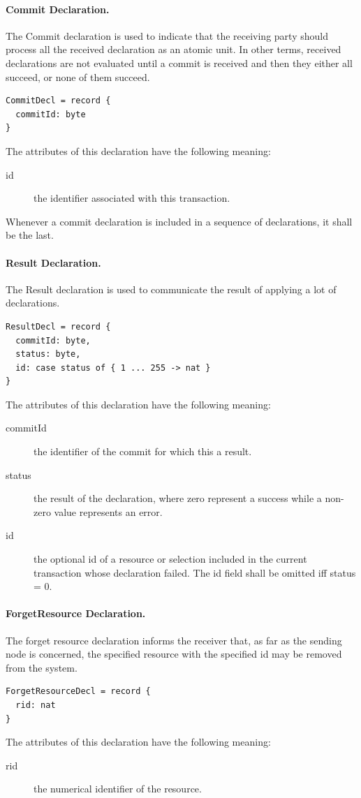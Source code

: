\documentclass[a4paper,oneside,article]{memoir}
\begin{document}
\paragraph{Commit Declaration.} The Commit declaration is used to indicate that the receiving party
should process all the received declaration as an atomic unit.  In other terms, received
declarations are not evaluated until a commit is received and then they either all succeed, or none
of them succeed.
\begin{verbatim}
CommitDecl = record {
  commitId: byte
}
\end{verbatim}
The attributes of this declaration have the following meaning:
\begin{description}
\item[id] the identifier associated with this transaction.
\end{description}
Whenever a commit declaration is included in a sequence of declarations, it shall be the last.

\paragraph{Result Declaration.} The Result declaration is used to communicate the result of
applying a lot of declarations.
\begin{verbatim}
ResultDecl = record {
  commitId: byte,
  status: byte,
  id: case status of { 1 ... 255 -> nat }
}
\end{verbatim}
The attributes of this declaration have the following meaning:
\begin{description}
\item[commitId] the identifier of the commit for which this a result.
\item[status] the result of the declaration, where zero represent a success while a non-zero value
  represents an error.
\item[id] the optional id of a resource or selection included in the current transaction whose
  declaration failed.  The id field shall be omitted iff status = 0.
\end{description}

\paragraph{ForgetResource Declaration.} The forget resource declaration informs the receiver that,
as far as the sending node is concerned, the specified resource with the specified id may be removed
from the system.
\begin{verbatim}
ForgetResourceDecl = record {
  rid: nat
}
\end{verbatim}
The attributes of this declaration have the following meaning:
\begin{description}
\item[rid] the numerical identifier of the resource.
\end{description}
\end{document}
